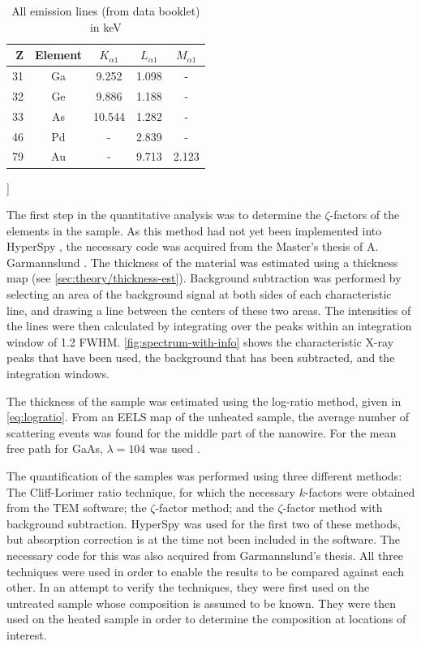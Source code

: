 \begin{table}[h]
	\caption{All emission lines (from data booklet) in keV}
	\begin{center}
		\begin{tabular}{rcccc}
			Z & Element & $K_{\alpha1}$ & $L_{\alpha1}$ & $M_{\alpha1}$ \\ \midrule
			31 & Ga & 9.252 & 1.098 & - \\
			32 & Ge &  9.886 & 1.188 & - \\
			33 & As & 10.544 & 1.282 & - \\
			46 & Pd & - & 2.839 & - \\
			79 & Au & - & 9.713 & 2.123 \\
		\end{tabular}
	\end{center}
\end{table}]

The first step in the quantitative analysis was to determine the $\zeta$-factors of the elements in the sample. As this method had not yet been implemented into HyperSpy \cite{hyperspy}, the necessary code was acquired from the Master's thesis of A. Garmannslund \cite{andreas}. The thickness of the material was estimated using a thickness map (see \cref{sec:theory/thickness-est}). Background subtraction was performed by selecting an area of the background signal at both sides of each characteristic line, and drawing a line between the centers of these two areas. The intensities of the lines were then calculated by integrating over the peaks within an integration window of 1.2 FWHM. \cref{fig:spectrum-with-info} shows the characteristic X-ray peaks that have been used, the background that has been subtracted, and the integration windows.

The thickness of the sample was estimated using the log-ratio method, given in \cref{eq:logratio}. From an EELS map of the unheated sample, the average number of scattering events was found for the middle part of the nanowire. For the mean free path for GaAs, $\lambda=104$ was used \cite{andreas}.

The quantification of the samples was performed using three different methods: The Cliff-Lorimer ratio technique, for which the necessary $k$-factors were obtained from the TEM software; the $\zeta$-factor method; and the $\zeta$-factor method with background subtraction. HyperSpy was used for the first two of these methods, but absorption correction is at the time not been included in the software. The necessary code for this was also acquired from Garmannslund's thesis. All three techniques were used in order to enable the results to be compared against each other. In an attempt to verify the techniques, they were first used on the untreated sample whose composition is assumed to be known. They were then used on the heated sample in order to determine the composition at locations of interest.
